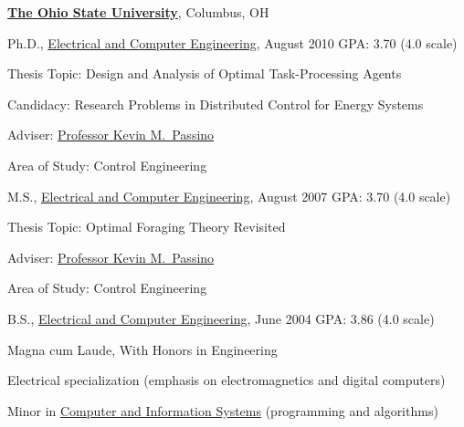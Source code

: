 \documentclass[10pt]{article}
\renewcommand\emph[1]{#1}
\begin{document}
\href{http://www.osu.edu/}{\textbf{The Ohio State University}},
Columbus, OH
\begin{outerlist}

\item[] Ph.D.,
        \href{http://www.ece.osu.edu/}
             {Electrical and Computer Engineering}, August 2010
             \hfill GPA: 3.70 (4.0 scale)
        \begin{innerlist}
        \item Thesis Topic: \emph{Design and Analysis of Optimal
            Task-Processing Agents}
        \item Candidacy: \emph{Research
            Problems in Distributed Control for Energy Systems}
        \item Adviser:
              \href{http://www.ece.osu.edu/~passino/}
                   {Professor Kevin M.~Passino}
        \item Area of Study: Control Engineering
        \end{innerlist}

\item[] M.S.,
        \href{http://www.ece.osu.edu/}
             {Electrical and Computer Engineering}, August 2007
             \hfill GPA: 3.70 (4.0 scale)
        \begin{innerlist}
        \item Thesis Topic: \emph{Optimal Foraging Theory Revisited}
        \item Adviser:
              \href{http://www.ece.osu.edu/~passino/}
                   {Professor Kevin M.~Passino}
        \item Area of Study: Control Engineering
        \end{innerlist}

\item[] B.S.,
        \href{http://www.ece.osu.edu/}
             {Electrical and Computer Engineering}, June 2004
             \hfill GPA: 3.86 (4.0 scale)
        \begin{innerlist}
        \item \emph{Magna cum Laude}, With Honors in Engineering
        \item Electrical specialization (emphasis on electromagnetics and digital computers)
        \item Minor in \href{http://www.cse.ohio-state.edu/}
                            {Computer and Information Systems}
              (programming and algorithms)
        \end{innerlist}

\end{outerlist}
\end{document}
